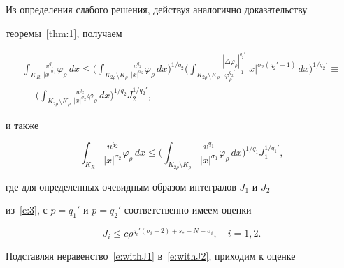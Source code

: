 \begin{pf}


Из определения слабого решения, действуя аналогично доказательству


теоремы~\ref{thm:1}, получаем


\begin{multline}\label{e:withJ2}


\int_{K_R}\frac{v^{q_1}}{|x|^{\sigma_1}}\varphi_\rho\,dx


\le


\Bigg(\int_{K_{2\rho}\setminus K_\rho}


\frac{u^{q_2}}{|x|^{\sigma_2}}\varphi_\rho\,dx\Bigg)^{1/q_2}


\Bigg(\int_{K_{2\rho}\setminus K_\rho}


\frac{|\Delta\varphi_\rho|^{q_2'}}


{\varphi_\rho^{q_2'-1}}|x|^{\sigma_2(q_2'-1)}\,dx


\Bigg)^{1/q_2'}\equiv \\


%


\equiv\Bigg(\int_{K_{2\rho}\setminus K_\rho}


\frac{u^{q_2}}{|x|^{\sigma_2}}\varphi_\rho\,dx\Bigg)^{1/q_2}


J_2^{1/q_2'},


\end{multline}


и также


\begin{equation}\label{e:withJ1}


\int_{K_R}\frac{u^{q_2}}{|x|^{\sigma_2}}\varphi_\rho\,dx \le


\Bigg(\int_{K_{2\rho}\setminus K_\rho}


\frac{v^{q_1}}{|x|^{\sigma_1}}\varphi_\rho\,dx\Bigg)^{1/q_1}


J_1^{1/q_1'},


\end{equation}


где для определенных очевидным образом интегралов $J_1$ и $J_2$


из~\eqref{e:3}, с $p=q_1'$ и $p=q_2'$ соответственно имеем оценки


$$


J_i\le c\rho^{q_i'(\sigma_i-2)+s_*+N-\sigma_i},


\quad i=1,2.


$$


Подставляя неравенство~\eqref{e:withJ1} в~\eqref{e:withJ2}, приходим к оценке



\end{pf}
